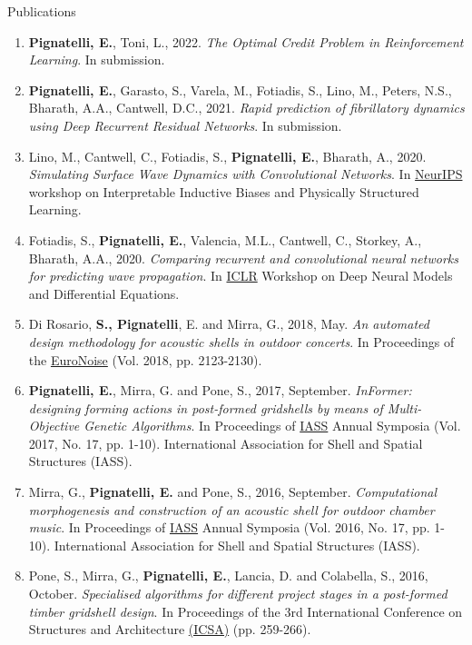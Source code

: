 \documentclass{resume}
\begin{document}
\begin{rSection}{Publications}
    \begin{enumerate}[leftmargin=0.45cm, itemsep=0em, topsep=0.5em, parsep=0.2em]
        \item \textbf{Pignatelli, E.}, Toni, L., 2022. \textit{The Optimal Credit Problem in Reinforcement Learning}. In submission.
        \item \textbf{Pignatelli, E.}, Garasto, S., Varela, M., Fotiadis, S., Lino, M., Peters, N.S., Bharath, A.A., Cantwell, D.C., 2021. \textit{Rapid prediction of fibrillatory dynamics using Deep Recurrent Residual Networks}. In submission.
        \item Lino, M., Cantwell, C., Fotiadis, S., \textbf{Pignatelli, E.}, Bharath, A., 2020. \textit{Simulating Surface Wave Dynamics with Convolutional Networks}. In \underline{NeurIPS} workshop on Interpretable Inductive Biases and Physically Structured Learning.
        \item Fotiadis, S., \textbf{Pignatelli, E.}, Valencia, M.L., Cantwell, C., Storkey, A., Bharath, A.A., 2020. \textit{Comparing recurrent and convolutional neural networks for predicting wave propagation}. In \underline{ICLR} Workshop on Deep Neural Models and Differential Equations.
        \item Di Rosario, \textbf{S., Pignatelli}, E. and Mirra, G., 2018, May. \textit{An automated design methodology for acoustic shells in outdoor concerts}. In Proceedings of the \underline{EuroNoise} (Vol. 2018, pp. 2123-2130).
        \item \textbf{Pignatelli, E.}, Mirra, G. and Pone, S., 2017, September. \textit{InFormer: designing forming actions in post-formed gridshells by means of Multi-Objective Genetic Algorithms}. In Proceedings of \underline{IASS} Annual Symposia (Vol. 2017, No. 17, pp. 1-10). International Association for Shell and Spatial Structures (IASS).
        \item Mirra, G., \textbf{Pignatelli, E.} and Pone, S., 2016, September. \textit{Computational morphogenesis and construction of an acoustic shell for outdoor chamber music}. In Proceedings of \underline{IASS} Annual Symposia (Vol. 2016, No. 17, pp. 1-10). International Association for Shell and Spatial Structures (IASS).
        \item Pone, S., Mirra, G., \textbf{Pignatelli, E.}, Lancia, D. and Colabella, S., 2016, October. \textit{Specialised algorithms for different project stages in a post-formed timber gridshell design}. In Proceedings of the 3rd International Conference on Structures and Architecture \underline{(ICSA)} (pp. 259-266).

\end{enumerate}
\end{rSection}
\end{document}

